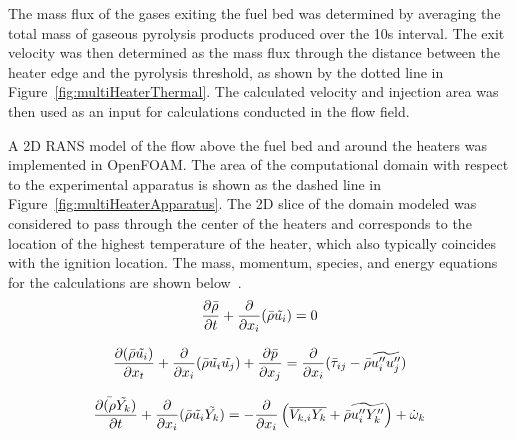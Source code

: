     The mass flux of the gases exiting the fuel bed was determined by averaging the total mass of gaseous pyrolysis products produced over the 10\si{\second} interval. The exit velocity was then determined as the mass flux through the distance between the heater edge and the pyrolysis threshold, as shown by the dotted line in Figure~\ref{fig:multiHeaterThermal}. The calculated velocity and injection area was then used as an input for calculations conducted in the flow field. 
    
    A 2D RANS model of the flow above the fuel bed and around the heaters was implemented in OpenFOAM. The area of the computational domain with respect to the experimental apparatus is shown as the dashed line in Figure~\ref{fig:multiHeaterApparatus}. The 2D slice of the domain modeled was considered to pass through the center of the heaters and corresponds to the location of the highest temperature of the heater, which also typically coincides with the ignition location. The  mass, momentum, species, and energy equations for the calculations are shown below~\cite{Versteeg2007AnMethod}.
            \begin{equation}
                \pder[\bar{\rho}]{t} + \pder{x_i} (\bar{\rho} \tilde{u_i}) = 0
            \end{equation}
            
            \begin{equation}
                \pder[(\bar{\rho} \tilde{u_i})]{x_t} + \pder{x_i} (\bar{\rho} \tilde{u_i} \tilde{u_j}) + \pder[\bar{p}]{x_j} = \pder{x_i} (\bar{\tau}_{ij} -\bar{\rho}\widetilde{u''_i u''_j})
            \end{equation}
            
            \begin{equation}
                \pder[\bar{(\rho} \tilde{Y_k})]{t} + \pder{x_i} (\bar{\rho} \tilde{u_i} \tilde{Y_k}) = - \pder{x_i} \left(\overline{V_{k,i}Y_{k}} + \bar{\rho} \widetilde{u''_{i} Y''_{k}}\right) +  \dot{\omega}_k
            \end{equation}

